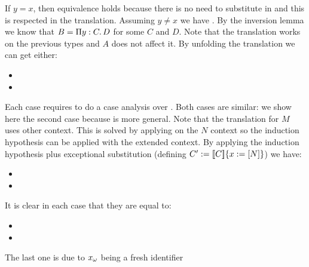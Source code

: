 \begin{Proof}
\begin{ProofCase}{\M{} \termDef{} }
If $y = x$, then equivalence holds because there is no need to substitute \x{} in \M{} and this is respected
in the translation. Assuming $y \neq x$ we have \mbox{}. 
By the inversion lemma we know that $B=\depArrow{y}{C}{D}$ for some $C$ and $D$. Note that the translation
works on the previous types and $A$ does not affect it. By unfolding the translation we can 
get either:
\begin{itemize}
\item {}
\item {}
\end{itemize}
Each case requires to do a case analysis over \weaklypropFun[A,B]. Both cases are similar: we show
here the second case because is more general. Note that the translation for $M$ uses other context. This 
is solved by applying  on the $N$ context so the induction hypothesis
can be applied with the extended context. By applying the induction hypothesis plus exceptional substitution
(defining $C'\termDef\subst{\TypeTrans{C}}{x}{\Trans{N}}$) we have:
\begin{itemize}
\item {}
\item {}
\end{itemize}
It is clear in each case that they are equal to:
\begin{itemize}
\item {}
\item {}
\end{itemize}
The last one is due to $x_{\omega}$ being a fresh identifier
\end{ProofCase}


\end{Proof}
